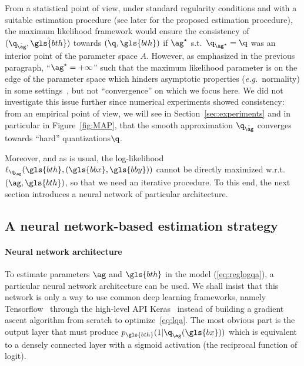 From a statistical point of view, 
under standard regularity conditions and with a suitable estimation procedure (see later for the proposed estimation procedure), the maximum likelihood framework would ensure the consistency of $(\q_{\hat{\ag}}, \hat{\gls{bth}})$ towards $(\q,\gls{bth})$ if $\ag^\star$ s.t.\ $\q_{\ag^\star} = \q$ was an interior point of the parameter space $A$. However, as emphasized in the previous paragraph, ``$\ag^\star = + \infty$'' such that the maximum likelihood parameter is on the edge of the parameter space which hinders asymptotic properties (\textit{e.g.}\ normality) in some settings~\cite{10.2307/2289471}, but not ``convergence'' on which we focus here. We did not investigate this issue further since numerical experiments showed consistency: from an empirical point of view, we will see in Section~\ref{sec:experiments} and in particular in Figure~\ref{fig:MAP}, that the smooth approximation $\q_{\hat{\ag}}$ converges towards ``hard'' quantizations\footnotemark[1] $\q$.

Moreover, and as is usual, the log-likelihood $\ell_{\q_{\ag}}(\gls{bth},(\gls{bbx},\gls{bby}))$ cannot be directly maximized w.r.t.\ $(\ag,\gls{bth})$, so that we need an iterative procedure. To this end, the next section introduces a neural network of particular architecture.


\subsection{A neural network-based estimation strategy} \label{sec:estim}

\paragraph{Neural network architecture}

To estimate parameters $\ag$ and $\gls{bth}$ in the model (\ref{eq:reglogqa}), a particular neural network architecture can be used. We shall insist that this network is only a way to use common deep learning frameworks, namely Tensorflow~\cite{tensorflow2015-whitepaper} through the high-level API Keras~\cite{chollet2015keras} instead of building a gradient ascent algorithm from scratch to optimize~\eqref{eq:lqa}. The most obvious part is the output layer that must produce $p_{\gls{bth}}(1|\q_{\ag}(\gls{bx}))$ which is equivalent to a densely connected layer with a sigmoid activation (the reciprocal function of logit).

